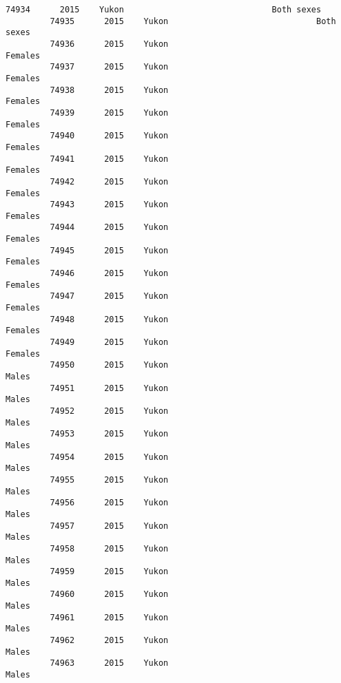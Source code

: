 \documentclass[11pt]{article}
\begin{document}
\begin{Verbatim}[commandchars=\\\{\}]
         74934      2015    Yukon                              Both sexes   
         74935      2015    Yukon                              Both sexes   
         74936      2015    Yukon                                 Females   
         74937      2015    Yukon                                 Females   
         74938      2015    Yukon                                 Females   
         74939      2015    Yukon                                 Females   
         74940      2015    Yukon                                 Females   
         74941      2015    Yukon                                 Females   
         74942      2015    Yukon                                 Females   
         74943      2015    Yukon                                 Females   
         74944      2015    Yukon                                 Females   
         74945      2015    Yukon                                 Females   
         74946      2015    Yukon                                 Females   
         74947      2015    Yukon                                 Females   
         74948      2015    Yukon                                 Females   
         74949      2015    Yukon                                 Females   
         74950      2015    Yukon                                   Males   
         74951      2015    Yukon                                   Males   
         74952      2015    Yukon                                   Males   
         74953      2015    Yukon                                   Males   
         74954      2015    Yukon                                   Males   
         74955      2015    Yukon                                   Males   
         74956      2015    Yukon                                   Males   
         74957      2015    Yukon                                   Males   
         74958      2015    Yukon                                   Males   
         74959      2015    Yukon                                   Males   
         74960      2015    Yukon                                   Males   
         74961      2015    Yukon                                   Males   
         74962      2015    Yukon                                   Males   
         74963      2015    Yukon                                   Males   
         

\end{Verbatim}
\end{document}
